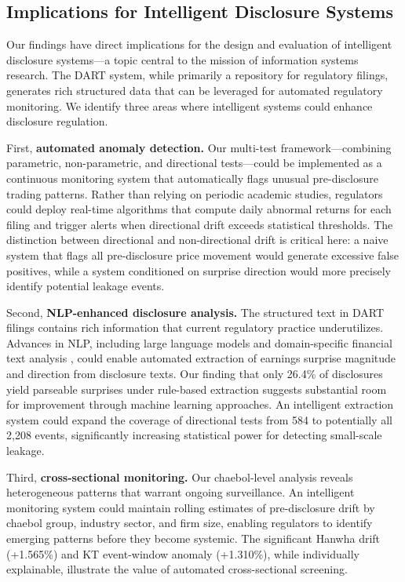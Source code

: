 \documentclass[manuscript,review]{acmart}
\begin{document}
\subsection{Implications for Intelligent Disclosure Systems}

Our findings have direct implications for the design and evaluation of intelligent disclosure systems---a topic central to the mission of information systems research. The DART system, while primarily a repository for regulatory filings, generates rich structured data that can be leveraged for automated regulatory monitoring. We identify three areas where intelligent systems could enhance disclosure regulation.

First, \textbf{automated anomaly detection.} Our multi-test framework---combining parametric, non-parametric, and directional tests---could be implemented as a continuous monitoring system that automatically flags unusual pre-disclosure trading patterns. Rather than relying on periodic academic studies, regulators could deploy real-time algorithms that compute daily abnormal returns for each filing and trigger alerts when directional drift exceeds statistical thresholds. The distinction between directional and non-directional drift is critical here: a naive system that flags all pre-disclosure price movement would generate excessive false positives, while a system conditioned on surprise direction would more precisely identify potential leakage events.

Second, \textbf{NLP-enhanced disclosure analysis.} The structured text in DART filings contains rich information that current regulatory practice underutilizes. Advances in NLP, including large language models \cite{lopez2023can} and domain-specific financial text analysis \cite{loughran2011liability, ke2020predicting}, could enable automated extraction of earnings surprise magnitude and direction from disclosure texts. Our finding that only 26.4\% of disclosures yield parseable surprises under rule-based extraction suggests substantial room for improvement through machine learning approaches. An intelligent extraction system could expand the coverage of directional tests from 584 to potentially all 2,208 events, significantly increasing statistical power for detecting small-scale leakage.

Third, \textbf{cross-sectional monitoring.} Our chaebol-level analysis reveals heterogeneous patterns that warrant ongoing surveillance. An intelligent monitoring system could maintain rolling estimates of pre-disclosure drift by chaebol group, industry sector, and firm size, enabling regulators to identify emerging patterns before they become systemic. The significant Hanwha drift (+1.565\%) and KT event-window anomaly (+1.310\%), while individually explainable, illustrate the value of automated cross-sectional screening.
\end{document}
